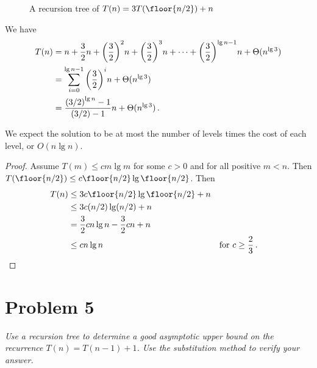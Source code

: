 \documentclass{abrice}
\begin{document}
\begin{figure*}
  \caption{A recursion tree of $T(n) = 3T(\floor{n/2}) + n$}
\end{figure*}

\noindent
We have
\begin{align*}
  T(n) &= n + {3 \over 2} n + {\left( {3 \over 2 } \right)}^2 n + {\left( {3
         \over 2 } \right)}^3 n + \cdots + {\left( {3 \over 2 } \right)}^{\lg n -
         1} n + \Theta (n^{\lg 3}) \\
  &= \sum_{i = 0}^{\lg n - 1} {\left( {3 \over 2} \right)}^i n + \Theta(n^{\lg
    3}) \\
  &= {{(3/2)}^{\lg n} - 1 \over (3/2) - 1} n + \Theta(n^{\lg 3}) \, .
\end{align*}

We expect the solution to be at most the number of levels times the cost of each
level, or $O(n \lg n)$.

\begin{proof}
  Assume $T(m) \leq cm \lg m$ for some $c > 0$ and for all positive $m <
  n$. Then $T(\floor{n / 2}) \leq c \floor{n / 2} \lg \floor{n / 2}$. Then
  \begin{align*}
    T(n) &\leq 3 c \floor{n / 2} \lg \floor{n / 2} + n\\
    &\leq 3 c (n / 2) \lg(n / 2) + n \\
    &= {3 \over 2} c n \lg n - {3 \over 2} c n + n \\
    &\leq c n \lg n && \text{for } c \geq {2 \over 3} \, .
  \end{align*}
\end{proof}

\section{Problem 5}
\emph{Use a recursion tree to determine a good asymptotic upper bound on the
  recurrence $T(n) = T(n - 1) + 1$. Use the substitution method to verify your
  answer.}
\medskip
\end{document}
